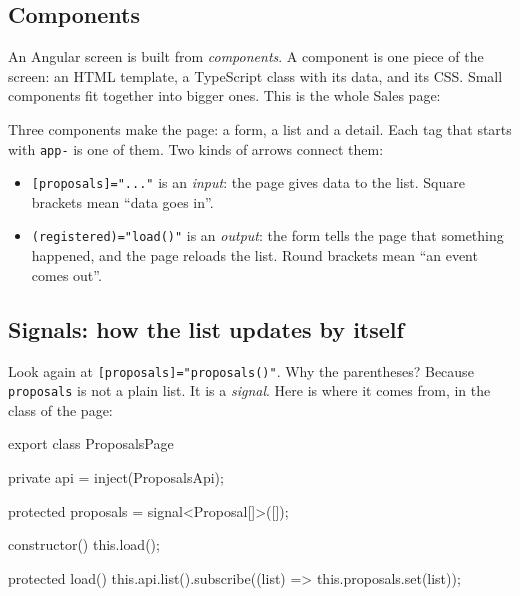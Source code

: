 \subsection*{Components}

An Angular screen is built from \emph{components}. A component is one piece
of the screen: an HTML template, a TypeScript class with its data, and its
CSS. Small components fit together into bigger ones. This is the whole Sales
page:


Three components make the page: a form, a list and a detail. Each tag that
starts with \texttt{app-} is one of them. Two kinds of arrows connect them:

\begin{itemize}
  \item \texttt{[proposals]="..."} is an \emph{input}: the page gives data
        to the list. Square brackets mean ``data goes in''.
  \item \texttt{(registered)="load()"} is an \emph{output}: the form tells
        the page that something happened, and the page reloads the list.
        Round brackets mean ``an event comes out''.
\end{itemize}

\subsection*{Signals: how the list updates by itself}

Look again at \texttt{[proposals]="proposals()"}. Why the parentheses? Because
\texttt{proposals} is not a plain list. It is a \emph{signal}. Here is where
it comes from, in the class of the page:

\begin{code}[language=hfts]
export class ProposalsPage {
  private api = inject(ProposalsApi);

  protected proposals = signal<Proposal[]>([]);

  constructor() {
    this.load();
  }

  protected load() {
    this.api.list().subscribe((list) => this.proposals.set(list));
  }
}
\end{code}

